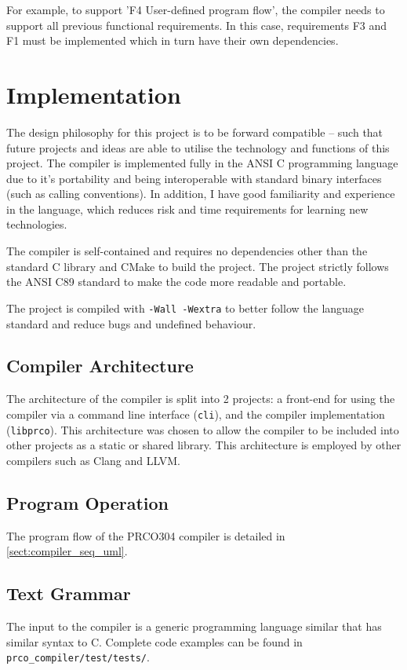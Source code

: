 \documentclass[11pt,a4paper]{report}
\newcommand{\scname}{PRCO304}
\begin{document}
For example, to support 'F4 User-defined program flow', the compiler needs to support all previous functional requirements. In this case, requirements F3 and F1 must be implemented which in turn have their own dependencies.

\section{Implementation}
The design philosophy for this project is to be forward compatible -- such that future projects and ideas are able to utilise the technology and functions of this project. The compiler is implemented fully in the ANSI C programming language due to it's portability and being interoperable with standard binary interfaces (such as calling conventions). In addition, I have good familiarity and experience in the language, which reduces risk and time requirements for learning new technologies.

The compiler is self-contained and requires no dependencies other than the standard C library and CMake to build the project. The project strictly follows the ANSI C89 standard to make the code more readable and portable. 

The project is compiled with \verb|-Wall -Wextra| to better follow the language standard and reduce bugs and undefined behaviour.

\subsection{Compiler Architecture}
The architecture of the compiler is split into 2 projects: a front-end for using the compiler via a command line interface (\verb|cli|), and the compiler implementation (\verb|libprco|). This architecture was chosen to allow the compiler to be included into other projects as a static or shared library. This architecture is employed by other compilers such as Clang and LLVM. 


\subsection{Program Operation}
The program flow of the \scname{} compiler is detailed in {} \ref{sect:compiler_seq_uml}. 



\subsection{Text Grammar}
\label{sect:compiler_grammar}
The input to the compiler is a generic programming language similar that has similar syntax to C. Complete code examples can be found in \verb|prco_compiler/test/tests/|.
\end{document}
